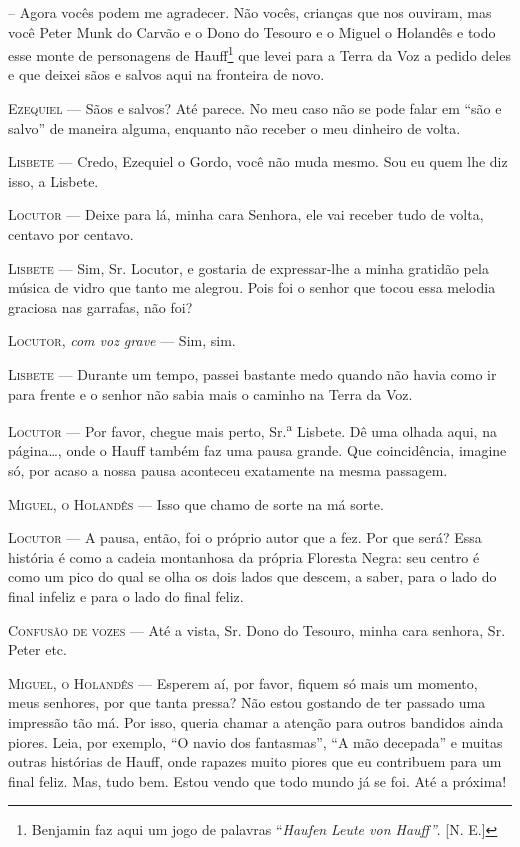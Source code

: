 -- Agora vocês podem me agradecer. Não vocês, crianças que nos ouviram,
mas você Peter Munk do Carvão e o Dono do Tesouro e o Miguel o Holandês
e todo esse monte de personagens de Hauff\footnote{Benjamin faz aqui um
  jogo de palavras ``\emph{Haufen} \emph{Leute von Hauff''}. [N.
  E.]} que levei para a Terra da Voz a pedido deles e que deixei sãos
e salvos aqui na fronteira de novo.

\textsc{Ezequiel} --- Sãos e salvos? Até parece. No meu caso não se pode falar em
``são e salvo'' de maneira alguma, enquanto não receber o meu dinheiro
de volta.

\textsc{Lisbete} --- Credo, Ezequiel o Gordo, você não muda mesmo. Sou eu quem lhe
diz isso, a Lisbete.

\textsc{Locutor} --- Deixe para lá, minha cara Senhora, ele vai receber tudo de
volta, centavo por centavo.

\textsc{Lisbete} --- Sim, Sr. Locutor, e gostaria de expressar-lhe a minha
gratidão pela música de vidro que tanto me alegrou. Pois foi o senhor
que tocou essa melodia graciosa nas garrafas, não foi?

\textsc{Locutor}, \emph{com voz grave} --- Sim, sim.

\textsc{Lisbete} --- Durante um tempo, passei bastante medo quando não havia como
ir para frente e o senhor não sabia mais o caminho na Terra da Voz.

\textsc{Locutor} --- Por favor, chegue mais perto, Sr.\textsuperscript{a} Lisbete.
Dê uma olhada aqui, na página\ldots{}, onde o Hauff também faz uma pausa
grande. Que coincidência, imagine só, por acaso a nossa pausa aconteceu
exatamente na mesma passagem.

\textsc{Miguel, o Holandês} --- Isso que chamo de sorte na má sorte.

\textsc{Locutor} --- A pausa, então, foi o próprio autor que a fez. Por que será?
Essa história é como a cadeia montanhosa da própria Floresta Negra: seu
centro é como um pico do qual se olha os dois lados que descem, a saber,
para o lado do final infeliz e para o lado do final feliz.

\textsc{Confusão de vozes} --- Até a vista, Sr. Dono do Tesouro, minha cara
senhora, Sr. Peter etc.

\textsc{Miguel, o Holandês} --- Esperem aí, por favor, fiquem só mais um momento,
meus senhores, por que tanta pressa? Não estou gostando de ter passado
uma impressão tão má. Por isso, queria chamar a atenção para outros
bandidos ainda piores. Leia, por exemplo, ``O navio dos fantasmas'', ``A
mão decepada'' e muitas outras histórias de Hauff, onde rapazes muito
piores que eu contribuem para um final feliz. Mas, tudo bem. Estou vendo
que todo mundo já se foi. Até a próxima!


